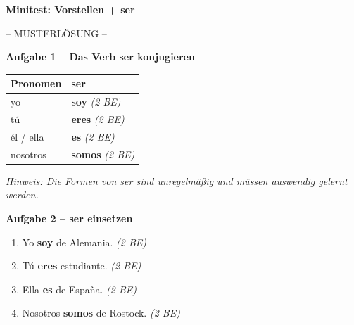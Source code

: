 \documentclass[11pt, a4paper]{article}
\newcommand{\punktebox}[1]{\hfill\fbox{\small \_\_\_/#1}}
\newcommand{\lsg}[1]{\textcolor{loesung}{\textbf{#1}}}
\begin{document}

\begin{center}
    {\Large\bfseries\textcolor{spanisch}{Minitest: Vorstellen + ser}}

    \vspace{5pt}
    {\large\textcolor{loesung}{-- MUSTERLÖSUNG --}}
\end{center}

\vspace{10pt}


\noindent\textbf{\textcolor{spanisch}{Aufgabe 1 -- Das Verb ser konjugieren}} \punktebox{8}

\vspace{10pt}

\begin{tabularx}{\textwidth}{|l|X|}
\hline
\textbf{Pronomen} & \textbf{ser} \\
\hline
yo & \lsg{soy} \hfill \textit{(2 BE)} \\
\hline
tú & \lsg{eres} \hfill \textit{(2 BE)} \\
\hline
él / ella & \lsg{es} \hfill \textit{(2 BE)} \\
\hline
nosotros & \lsg{somos} \hfill \textit{(2 BE)} \\
\hline
\end{tabularx}

\vspace{5pt}
\textit{Hinweis: Die Formen von ser sind unregelmäßig und müssen auswendig gelernt werden.}

\vspace{15pt}


\noindent\textbf{\textcolor{spanisch}{Aufgabe 2 -- ser einsetzen}} \punktebox{8}

\vspace{10pt}

\begin{enumerate}[label=\alph*)]
    \item Yo \lsg{soy} de Alemania. \hfill \textit{(2 BE)}
    \item Tú \lsg{eres} estudiante. \hfill \textit{(2 BE)}
    \item Ella \lsg{es} de España. \hfill \textit{(2 BE)}
    \item Nosotros \lsg{somos} de Rostock. \hfill \textit{(2 BE)}
\end{enumerate}
\end{document}
